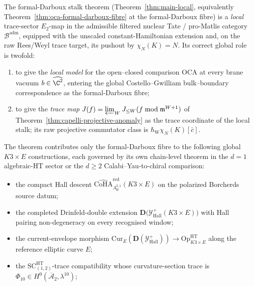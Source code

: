 \begin{rmk}
\label{rmk:formal-darboux-stalk-scalar-nonfaithfulness}
The formal-Darboux stalk theorem
(Theorem~\ref{thm:main-local}, equivalently
Theorem~\ref{thm:oca-formal-darboux-fibre} at the formal-Darboux
fibre) is a \emph{local} trace-sector \(E_2\)-map in the
admissible filtered nuclear Tate / pro-Matlis category
\(\mathcal B^{\mathrm{adm}}\), equipped with the unscaled
constant-Hamiltonian extension and, on the raw Rees/Weyl trace target,
its pushout by \(\chi_N(K)=N\).  Its correct global role is
twofold:
\begin{enumerate}[label=\textup{(\roman*)}]
  \item to give the \emph{local model} for the open--closed
        comparison \(\mathrm{OCA}\) at every brane vacuum
        \(b\in\widehat{\C^2}\), entering the global Costello--Gwilliam
        bulk--boundary correspondence as the formal-Darboux fibre;
  \item to give the \emph{trace map}
        \(J(f)=\varprojlim_WJ_{\leq W}(f\bmod\mathfrak m^{W+1})\) of
        Theorem~\ref{thm:capelli-projective-anomaly} as the trace
        coordinate of the local stalk; its raw projective commutator
        class is \(\hbar_{\mathrm W}\chi_N(K)[\bar c]\).
\end{enumerate}
The theorem contributes only the formal-Darboux fibre to the following
global \(K3\times E\) constructions, each governed by its own
chain-level theorem in the \(d=1\) algebraic-HT sector or the
\(d\geq 2\) Calabi--Yau-to-chiral comparison:
\begin{itemize}
  \item the compact Hall descent
        \(\widehat{\mathrm{CoHA}}^{\mathrm{red}}_{\Lambda^{2,1}_{\mathrm{II}}}(K3\times E)\)
        on the polarized Borcherds source datum;
  \item the completed Drinfeld-double extension
        \(\mathbf{D}\bigl(\mathcal Y^{+}_{\mathrm{Hall}}(K3\times E)\bigr)\)
        with Hall pairing non-degeneracy on every recognised window;
  \item the current-envelope morphism
        \(\mathrm{Cur}_E(\mathbf D(\mathcal Y^{+}_{\mathrm{Hall}}))
        \to \mathrm{Op}^{\mathrm{HT}}_{K3\times E}\) along the
        reference elliptic curve \(E\);
  \item the \(\mathrm{SC}^{\mathrm{HT}}_{(1,2)}\)-trace compatibility
        whose curvature-section trace is
        \(\Phi_{10}\in H^0(\overline{\mathcal A}_2,\lambda^{10})\);

\end{itemize}
\end{rmk}
